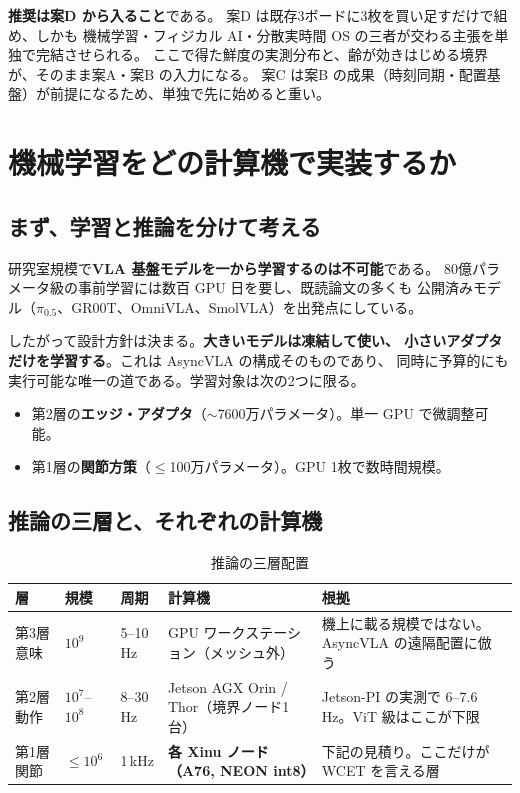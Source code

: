 \documentclass[11pt,a4paper]{article}
\newcommand{\prob}[1]{\textbf{\textcolor{red!55!black}{#1}}}
\newcommand{\keyp}[1]{\textbf{\textcolor{blue!45!black}{#1}}}
\begin{document}
\noindent
\keyp{推奨は案D から入ること}である。
案D は既存3ボードに3枚を買い足すだけで組め、しかも
機械学習・フィジカル AI・分散実時間 OS の三者が交わる主張を単独で完結させられる。
ここで得た鮮度の実測分布と、齢が効きはじめる境界が、そのまま案A・案B の入力になる。
案C は案B の成果（時刻同期・配置基盤）が前提になるため、単独で先に始めると重い。

\section{機械学習をどの計算機で実装するか}
\label{sec:mlhw}

\subsection{まず、学習と推論を分けて考える}

研究室規模で\prob{VLA 基盤モデルを一から学習するのは不可能}である。
80億パラメータ級の事前学習には数百 GPU 日を要し、既読論文の多くも
公開済みモデル（$\pi_{0.5}$、GR00T、OmniVLA、SmolVLA）を出発点にしている。

したがって設計方針は決まる。\keyp{大きいモデルは凍結して使い、
小さいアダプタだけを学習する}。これは AsyncVLA の構成そのものであり、
同時に予算的にも実行可能な唯一の道である。学習対象は次の2つに限る。

\begin{itemize}[leftmargin=1.4em,itemsep=2pt]
  \item 第2層の\keyp{エッジ・アダプタ}（$\sim$7600万パラメータ）。単一 GPU で微調整可能。
  \item 第1層の\keyp{関節方策}（$\le$100万パラメータ）。GPU 1枚で数時間規模。
\end{itemize}

\subsection{推論の三層と、それぞれの計算機}

\begin{table}[htbp]
\centering
\small
\caption{推論の三層配置}
\label{tab:tier}
\begin{tabularx}{\textwidth}{@{}l l l l X@{}}
\toprule
\textbf{層} & \textbf{規模} & \textbf{周期} & \textbf{計算機} & \textbf{根拠} \\
\midrule
第3層 意味 & $10^9$ & 5--10\,Hz & GPU ワークステーション（メッシュ外） &
  機上に載る規模ではない。AsyncVLA の遠隔配置に倣う \\
第2層 動作 & $10^7$--$10^8$ & 8--30\,Hz & Jetson AGX Orin / Thor（境界ノード1台） &
  Jetson-PI の実測で 6--7.6\,Hz。ViT 級はここが下限 \\
第1層 関節 & $\le 10^6$ & 1\,kHz & \keyp{各 Xinu ノード（A76, NEON int8）} &
  下記の見積り。ここだけが WCET を言える層 \\
\bottomrule
\end{tabularx}
\end{table}
\end{document}
